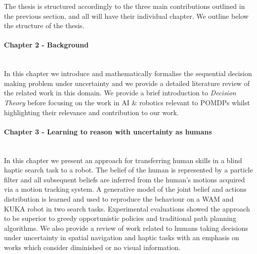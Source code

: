The thesis is structured accordingly to the three main contributions outlined in the previous section, 
and all will have their individual chapter. We outline below the structure of the thesis.

\begin{minipage}[c]{0.9\textwidth}
\paragraph{Chapter 2 - Background}\\
In this chapter we introduce and mathematically formalise the sequential decision making problem 
under uncertainty and we provide a detailed literature review of the related work in this domain.
We provide a brief introduction to \textit{Decision Theory} before focusing on the work 
in AI \& robotics relevant to POMDPs whilst highlighting their relevance and contribution to our work. 
\end{minipage}

\begin{minipage}[c]{0.9\textwidth}
\paragraph{Chapter 3 - Learning to reason with uncertainty as humans}\\
In this chapter we present an approach for transferring human skills in a blind haptic 
search task to a robot. The belief of the human is represented by a particle filter and 
all subsequent beliefs are inferred from the human's motions acquired via a motion tracking
system. A generative model of the joint belief and actions distribution is learned and used
to reproduce the behaviour on a WAM and KUKA robot in two search tasks. Experimental 
evaluations showed the approach to be superior to greedy opportunistic policies and traditional
path planning algorithms. 
We also provide a review of work related to humans taking decisions under uncertainty 
in spatial navigation and haptic tasks with an emphasis on works which consider diminished or no 
visual information. 
\end{minipage}

